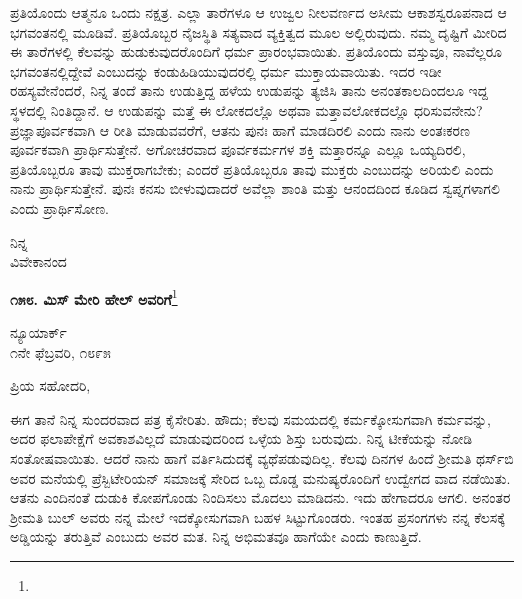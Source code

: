 ಪ್ರತಿಯೊಂದು ಆತ್ಮನೂ ಒಂದು ನಕ್ಷತ್ರ. ಎಲ್ಲಾ ತಾರೆಗಳೂ ಆ ಉಜ್ವಲ ನೀಲವರ್ಣದ ಅಸೀಮ ಆಕಾಶಸ್ವರೂಪನಾದ ಆ ಭಗವಂತನಲ್ಲಿ ಮೂಡಿವೆ. ಪ್ರತಿಯೊಬ್ಬರ ನೈಜಸ್ಥಿತಿ ಸತ್ಯವಾದ ವ್ಯಕ್ತಿತ್ವದ ಮೂಲ ಅಲ್ಲಿರುವುದು. ನಮ್ಮ ದೃಷ್ಟಿಗೆ ಮೀರಿದ ಈ ತಾರೆಗಳಲ್ಲಿ ಕೆಲವನ್ನು ಹುಡುಕುವುದರೊಂದಿಗೆ ಧರ್ಮ ಪ್ರಾರಂಭವಾಯಿತು. ಪ್ರತಿಯೊಂದು ವಸ್ತುವೂ, ನಾವೆಲ್ಲರೂ ಭಗವಂತನಲ್ಲಿದ್ದೇವೆ ಎಂಬುದನ್ನು ಕಂಡುಹಿಡಿಯುವುದರಲ್ಲಿ ಧರ್ಮ ಮುಕ್ತಾಯವಾಯಿತು. ಇದರ ಇಡೀ ರಹಸ್ಯವೇನೆಂದರೆ, ನಿನ್ನ ತಂದೆ ತಾನು ಉಡುತ್ತಿದ್ದ ಹಳೆಯ ಉಡುಪನ್ನು ತ್ಯಜಿಸಿ ತಾನು ಅನಂತಕಾಲದಿಂದಲೂ ಇದ್ದ ಸ್ಥಳದಲ್ಲಿ ನಿಂತಿದ್ದಾನೆ. ಆ ಉಡುಪನ್ನು ಮತ್ತೆ ಈ ಲೋಕದಲ್ಲೊ ಅಥವಾ ಮತ್ತಾವಲೋಕದಲ್ಲೊ ಧರಿಸುವನೇನು? ಪ್ರಜ್ಞಾಪೂರ್ವಕವಾಗಿ ಆ ರೀತಿ ಮಾಡುವವರೆಗೆ, ಆತನು ಪುನಃ ಹಾಗೆ ಮಾಡದಿರಲಿ ಎಂದು ನಾನು ಅಂತಃಕರಣ ಪೂರ್ವಕವಾಗಿ ಪ್ರಾರ್ಥಿಸುತ್ತೇನೆ. ಅಗೋಚರವಾದ ಪೂರ್ವಕರ್ಮಗಳ ಶಕ್ತಿ ಮತ್ತಾರನ್ನೂ ಎಲ್ಲೂ ಒಯ್ಯದಿರಲಿ, ಪ್ರತಿಯೊಬ್ಬರೂ ತಾವು ಮುಕ್ತರಾಗಬೇಕು; ಎಂದರೆ ಪ್ರತಿಯೊಬ್ಬರೂ ತಾವು ಮುಕ್ತರು ಎಂಬುದನ್ನು ಅರಿಯಲಿ ಎಂದು ನಾನು ಪ್ರಾರ್ಥಿಸುತ್ತೇನೆ. ಪುನಃ ಕನಸು ಬೀಳುವುದಾದರೆ ಅವೆಲ್ಲಾ ಶಾಂತಿ ಮತ್ತು ಆನಂದದಿಂದ ಕೂಡಿದ ಸ್ವಪ್ನಗಳಾಗಲಿ ಎಂದು ಪ್ರಾರ್ಥಿಸೋಣ.

\vspace{-0.5cm}

{\flushright
ನಿನ್ನ\\ವಿವೇಕಾನಂದ\par}

\begin{center}
\textbf{೧೫೮. ಮಿಸ್ ಮೇರಿ ಹೇಲ್‌ ಅವರಿಗೆ}\footnote{}
\end{center}

\vspace{-0.8cm}

\begin{flushright}
ನ್ಯೂಯಾರ್ಕ್\\೧ನೇ ಫೆಬ್ರವರಿ, ೧೮೯೫
\end{flushright}
\vspace{-0.5cm}

\noindent
ಪ್ರಿಯ ಸಹೋದರಿ,

ಈಗ ತಾನೆ ನಿನ್ನ ಸುಂದರವಾದ ಪತ್ರ ಕೈಸೇರಿತು. ಹೌದು; ಕೆಲವು ಸಮಯದಲ್ಲಿ ಕರ್ಮಕ್ಕೋಸುಗವಾಗಿ ಕರ್ಮವನ್ನು, ಅದರ ಫಲಾಪೇಕ್ಷೆಗೆ ಅವಕಾಶವಿಲ್ಲದೆ ಮಾಡುವುದರಿಂದ ಒಳ್ಳೆಯ ಶಿಸ್ತು ಬರುವುದು. ನಿನ್ನ ಟೀಕೆಯನ್ನು ನೋಡಿ ಸಂತೋಷವಾಯಿತು. ಆದರೆ ನಾನು ಹಾಗೆ ವರ್ತಿಸಿದುದಕ್ಕೆ ವ್ಯಥೆಪಡುವುದಿಲ್ಲ. ಕೆಲವು ದಿನಗಳ ಹಿಂದೆ ಶ‍್ರೀಮತಿ ಥರ್ಸ್‌ಬಿ ಅವರ ಮನೆಯಲ್ಲಿ ಪ್ರೆಸ್ಬಿಟೇರಿಯನ್ ಸಮಾಜಕ್ಕೆ ಸೇರಿದ ಒಬ್ಬ ದೊಡ್ಡ ಮನುಷ್ಯರೊಂದಿಗೆ ಉದ್ವೇಗದ ವಾದ ನಡೆಯಿತು. ಆತನು ಎಂದಿನಂತೆ ದುಡುಕಿ ಕೋಪಗೊಂಡು ನಿಂದಿಸಲು ಮೊದಲು ಮಾಡಿದನು. ಇದು ಹೇಗಾದರೂ ಆಗಲಿ. ಅನಂತರ ಶ‍್ರೀಮತಿ ಬುಲ್ ಅವರು ನನ್ನ ಮೇಲೆ ಇದಕ್ಕೋಸುಗವಾಗಿ ಬಹಳ ಸಿಟ್ಟುಗೊಂಡರು. ಇಂತಹ ಪ್ರಸಂಗಗಳು ನನ್ನ ಕೆಲಸಕ್ಕೆ ಅಡ್ಡಿಯನ್ನು ತರುತ್ತಿವೆ ಎಂಬುದು ಅವರ ಮತ. ನಿನ್ನ ಅಭಿಮತವೂ ಹಾಗೆಯೇ ಎಂದು ಕಾಣುತ್ತಿದೆ.

